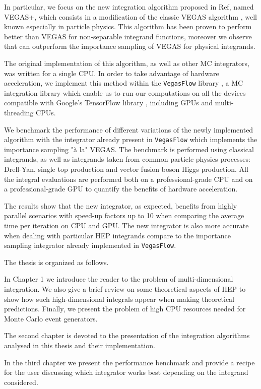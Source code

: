 \documentclass[../main/main.tex]{subfiles}
\begin{document}
In particular, we focus on the new integration algorithm proposed in Ref\cite{Lepage:2020tgj}, named VEGAS+, which consists in a modification of the classic VEGAS algorithm \cite{Lepage:1977sw}, well known especially in particle physics. This algorithm has been proven to perform better than VEGAS for non-separable integrand functions, moreover we observe that can outperform the importance sampling of VEGAS for physical integrands.

The original implementation of this algorithm, as well as other MC integrators, was written for a single CPU. In order to take advantage of hardware acceleration, we implement this method within the \texttt{VegasFlow} library \cite{vegasflow_package},  a MC integration library which enable us to run our computations on all the devices compatible with Google's TensorFlow library \cite{tensorflow2015-whitepaper}, including GPUs and multi-threading CPUs. 

We benchmark the performance of different variations of the newly implemented algorithm with the integrator already present in \texttt{VegasFlow} which implements  the importance sampling "à la" VEGAS. The benchmark is performed using classical integrands, as well as integrands taken from common particle physics processes: Drell-Yan, single top production and vector fusion boson Higgs production. All the integral evaluations are performed both on a professional-grade CPU and on a professional-grade GPU to quantify the benefits of hardware acceleration.

The results show that the new integrator, as expected, benefits from highly parallel scenarios with speed-up factors up to 10 when comparing the average time per iteration on CPU and GPU. The new integrator is also more accurate when dealing with particular HEP integrands compare to the importance sampling integrator already implemented in \texttt{VegasFlow}.


The thesis is organized as follows.

In Chapter 1 we introduce the reader to the problem of multi-dimensional integration. We also give a brief review on some theoretical aspects of HEP to show how such high-dimensional integrals appear when making theoretical predictions.  Finally, we present the problem of high CPU resources needed for Monte Carlo event generators.

The second chapter is devoted to the presentation of the integration algorithms analysed in this thesis and their implementation.

In the third chapter we present the performance benchmark and provide a recipe for the user discussing which integrator works best depending on the integrand considered.
\end{document}
